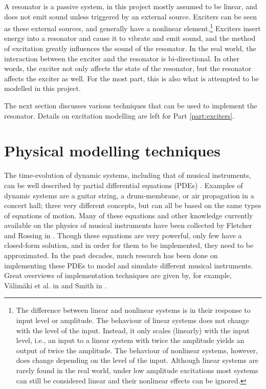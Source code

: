 A resonator is a passive system, in this project mostly assumed to be linear, and does not emit sound unless triggered by an external source. Exciters can be seen as these external sources, and generally have a nonlinear element.\footnote{The difference between linear and nonlinear systems is in their response to input level or amplitude. The behaviour of linear systems does not change with the level of the input. Instead, it only scales (linearly) with the input level, i.e., an input to a linear system with twice the amplitude yields an output of twice the amplitude. The behaviour of nonlinear systems, however, does change depending on the level of the input. Although linear systems are rarely found in the real world, under low amplitude excitations most systems can still be considered linear and their nonlinear effects can be ignored.} Exciters insert energy into a resonator and cause it to vibrate and emit sound, and the method of excitation greatly influences the sound of the resonator. In the real world, the interaction between the exciter and the resonator is bi-directional. In other words, the exciter not only affects the state of the resonator, but the resonator affects the exciter as well. For the most part, this is also what is attempted to be modelled in this project.

The next section discusses various techniques that can be used to implement the resonator. Details on excitation modelling are left for Part \ref{part:exciters}.

\section{Physical modelling techniques}\label{sec:physModTech}
The time-evolution of dynamic systems, including that of musical instruments, can be well described by partial differential equations (PDEs) \cite{Fletcher1998, theBible}. Examples of dynamic systems are a guitar string, a drum-membrane, or air propagation in a concert hall; three very different concepts, but can all be based on the same types of equations of motion. Many of these equations and other knowledge currently available on the physics of musical instruments have been collected by Fletcher and Rossing in \cite{Fletcher1998}. Though these equations are very powerful, only few have a closed-form solution, and in order for them to be implemented, they need to be approximated. In the past decades, much research has been done on implementing these PDEs to model and simulate different musical instruments. Great overviews of implementation techniques are given by, for example, V{\"a}lim{\"a}ki et al. in \cite{Valimaki2006} and Smith in \cite{Smith2010a, Smith2010b}. 
\\

